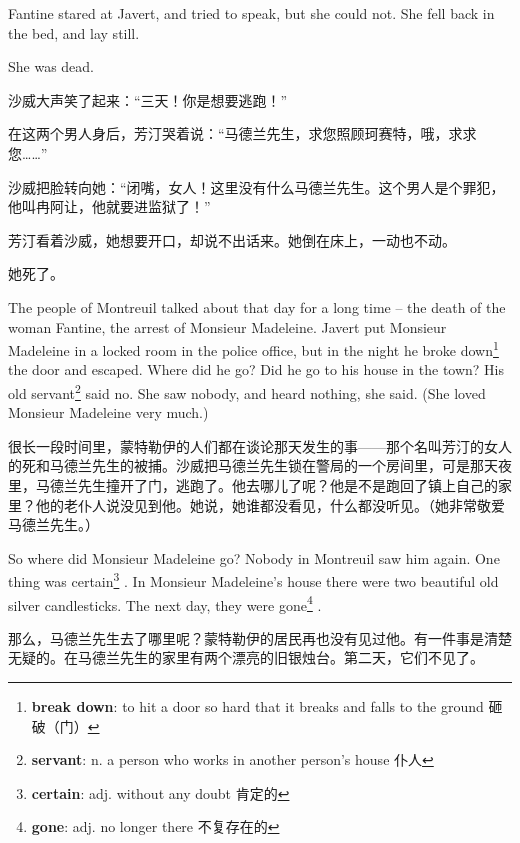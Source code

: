 \documentclass[fontset=ubuntu, zihao=5]{ctexart}
\begin{document}
\begin{paracol}{2}
  Fantine stared at Javert, and tried to speak, but she could not. She fell back in the bed, and lay still.

  She was dead.


  \switchcolumn

  沙威大声笑了起来：“三天！你是想要逃跑！”

  在这两个男人身后，芳汀哭着说：“马德兰先生，求您照顾珂赛特，哦，求求您……”


  沙威把脸转向她：“闭嘴，女人！这里没有什么马德兰先生。这个男人是个罪犯，他叫冉阿让，他就要进监狱了！”


  芳汀看着沙威，她想要开口，却说不出话来。她倒在床上，一动也不动。


  她死了。

  \switchcolumn*

  The people of Montreuil talked about that day for a long time – the death of the woman Fantine, the arrest of Monsieur Madeleine. Javert put Monsieur Madeleine in a locked room in the police office, but in the night he broke down\footnote{\textbf{break down}: to hit a door so hard that it breaks and falls to the ground 砸破（门）}
  the door and escaped. Where did he go? Did he go to his house in the town? His old servant\footnote{\textbf{servant}: n. a person who works in another person's house 仆人}
  said no. She saw nobody, and heard nothing, she said. (She loved Monsieur Madeleine very much.)

  \switchcolumn

  很长一段时间里，蒙特勒伊的人们都在谈论那天发生的事——那个名叫芳汀的女人的死和马德兰先生的被捕。沙威把马德兰先生锁在警局的一个房间里，可是那天夜里，马德兰先生撞开了门，逃跑了。他去哪儿了呢？他是不是跑回了镇上自己的家里？他的老仆人说没见到他。她说，她谁都没看见，什么都没听见。（她非常敬爱马德兰先生。）

  \switchcolumn*

  So where did Monsieur Madeleine go? Nobody in Montreuil saw him again. One thing was certain\footnote{\textbf{certain}: adj. without any doubt 肯定的}
  . In Monsieur Madeleine's house there were two beautiful old silver candlesticks. The next day, they were gone\footnote{\textbf{gone}:  adj. no longer there 不复存在的}
  .

  \switchcolumn

  那么，马德兰先生去了哪里呢？蒙特勒伊的居民再也没有见过他。有一件事是清楚无疑的。在马德兰先生的家里有两个漂亮的旧银烛台。第二天，它们不见了。

\end{paracol}
\end{document}
